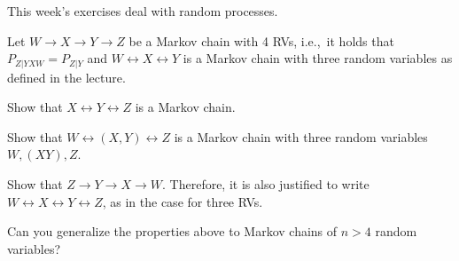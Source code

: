 \documentclass[a4paper,10pt,landscape,twocolumn]{scrartcl}
\begin{document}
\practiceproblems

{\sffamily\noindent
This week's exercises deal with random processes. \practiceinstructions
}

\begin{exercise}
Let $W \rightarrow X \rightarrow Y \rightarrow Z$ be a Markov chain with 4 RVs, i.e.,\ it holds that $P_{Z|YXW} = P_{Z|Y}$ and $W \leftrightarrow X \leftrightarrow Y$ is a Markov chain with three random variables as defined in the lecture.
\begin{subex}
	Show that $X \leftrightarrow Y \leftrightarrow Z$ is a Markov chain.
\end{subex}
\begin{subex}
Show that $W \leftrightarrow (X,Y) \leftrightarrow Z$ is a Markov chain with three random variables $W, (XY), Z$.
\end{subex}
\begin{subex}
Show that $Z \rightarrow Y \rightarrow X \rightarrow W$. Therefore, it is also justified to write $W \leftrightarrow X \leftrightarrow Y \leftrightarrow Z$, as in the case for three RVs.
\end{subex}
\begin{subex**}
Can you generalize the properties above to Markov chains of $n>4$ random variables?
\end{subex**}
\end{exercise}




\end{document}
